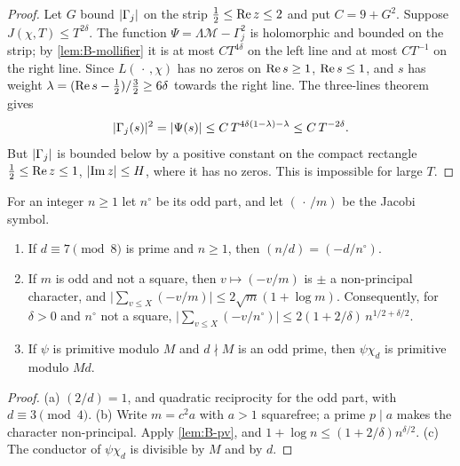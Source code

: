 \begin{proof}
Let $G$ bound $\lvert \Gamma_j\rvert$ on the strip $\frac12\le\operatorname{Re} z\le2$ and put $C=9+G^2$. Suppose
$J(\chi,T)\le T^{2\delta}$. The function $\Psi=\Lambda\mathcal M-\Gamma_j^2$ is holomorphic and bounded
on the strip; by \cref{lem:B-mollifier} it is at most $CT^{4\delta}$ on the left line and at most
$CT^{-1}$ on the right line. Since $L(\,\cdot\,,\chi)$ has no zeros on $\operatorname{Re} s\ge1$, $\operatorname{Re} s\le1$, and $s$
has weight $\lambda=(\operatorname{Re} s-\frac12)/\frac32\ge6\delta$ towards the right line. The three-lines theorem
gives
\[
  \lvert \Gamma_j(s)\rvert^2=\lvert \Psi(s)\rvert\le C\,T^{4\delta(1-\lambda)-\lambda}\le C\,T^{-2\delta}.
\]
But $\lvert \Gamma_j\rvert$ is bounded below by a positive constant on the compact rectangle
$\frac12\le\operatorname{Re} z\le1$, $\lvert \operatorname{Im} z\rvert\le H$, where it has no zeros. This is impossible for large $T$.
\end{proof}

For an integer $n\ge1$ let $n^\circ$ be its odd part, and let $(\,\cdot\,/m)$ be the Jacobi symbol.

\begin{lemma}\label{lem:B-jacobi}
\begin{enumerate}[label=\textup{(\alph*)}]
\item If $d\equiv7\pmod8$ is prime and $n\ge1$, then $(n/d)=(-d/n^\circ)$.
\item If $m$ is odd and not a square, then $v\mapsto(-v/m)$ is $\pm$ a non-principal character, and
$\bigl\lvert\sum_{v\le X}(-v/m)\bigr\rvert\le2\sqrt m(1+\log m)$. Consequently, for $\delta>0$ and $n^\circ$
not a square, $\bigl\lvert\sum_{v\le X}(-v/n^\circ)\bigr\rvert\le2(1+2/\delta)\,n^{1/2+\delta/2}$.
\item If $\psi$ is primitive modulo $M$ and $d\nmid M$ is an odd prime, then $\psi\chi_d$ is primitive
modulo $Md$.
\end{enumerate}
\end{lemma}

\begin{proof}
(a) $(2/d)=1$, and quadratic reciprocity for the odd part, with $d\equiv3\pmod4$. (b) Write $m=c^2a$ with
$a>1$ squarefree; a prime $p\mid a$ makes the character non-principal. Apply \cref{lem:B-pv}, and
$1+\log n\le(1+2/\delta)n^{\delta/2}$. (c) The conductor of $\psi\chi_d$ is divisible by $M$ and by $d$.
\end{proof}

